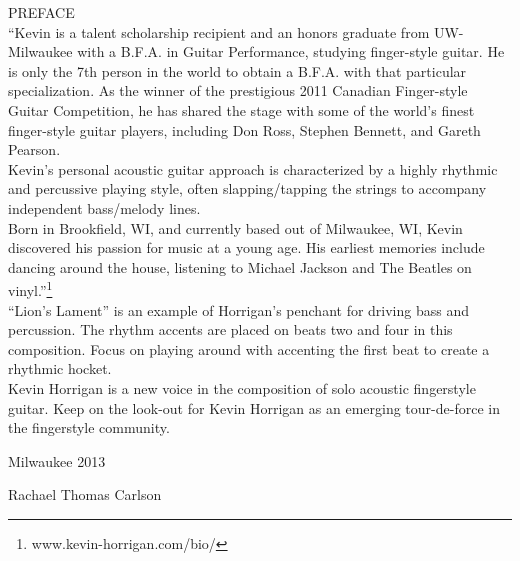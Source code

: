 \begin{titlepage}
    \vspace*{1.73cm}
    {\Large PREFACE}\\[.5cm]
    ``Kevin is a talent scholarship recipient and an honors graduate from
    UW-Milwaukee with a B.F.A. in Guitar Performance, studying finger-style
    guitar. He is only the 7th person in the world to obtain a B.F.A. with that
    particular specialization.  As the winner of the prestigious 2011 Canadian
    Finger-style Guitar Competition, he has shared the stage with some of the
    world's finest finger-style guitar players, including Don Ross, Stephen
    Bennett, and Gareth Pearson.\\
    Kevin's personal acoustic guitar approach is characterized by a highly rhythmic
    and percussive playing style, often slapping/tapping the strings to accompany
    independent bass/melody lines.\\
    Born in Brookfield, WI, and currently based out of Milwaukee, WI, Kevin
    discovered his passion for music at a young age. His earliest memories include
    dancing around the house, listening to Michael Jackson and The Beatles on
    vinyl.''\footnote[1]{www.kevin-horrigan.com/bio/}\\
    ``Lion's Lament'' is an example of Horrigan's penchant for driving bass and
    percussion.  The rhythm accents are placed on beats two and four in this
    composition.  Focus on playing around with accenting the first beat to
    create a rhythmic hocket.\\  
    Kevin Horrigan is a new voice in the composition of solo acoustic
    fingerstyle guitar.  Keep on the look-out for Kevin Horrigan as an emerging
    tour-de-force in the fingerstyle community.\\

    \date{}
    \begin{center}
    \begin{minipage}{0.4\textwidth}
        \begin{flushleft} 
            Milwaukee 2013\\
        \end{flushleft}
    \end{minipage}
    \begin{minipage}{0.4\textwidth}
        \begin{flushright} 
            Rachael Thomas Carlson
        \end{flushright}
    \end{minipage}
    \end{center}
    \vfill
\end{titlepage}

